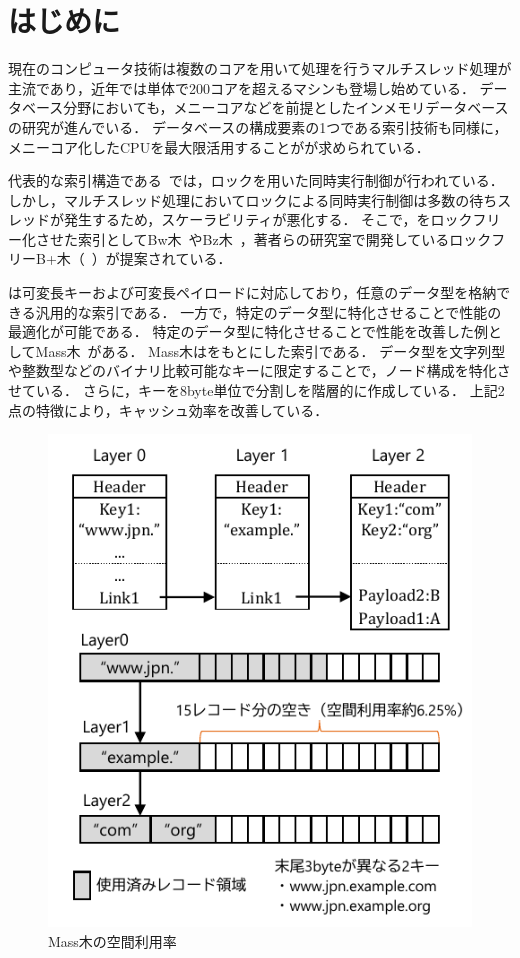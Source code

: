 
\section{はじめに}
現在のコンピュータ技術は複数のコアを用いて処理を行うマルチスレッド処理が主流であり，近年では単体で200コアを超えるマシンも登場し始めている．
データベース分野においても，メニーコアなどを前提としたインメモリデータベースの研究が進んでいる．
データベースの構成要素の1つである索引技術も同様に，メニーコア化したCPUを最大限活用することがが求められている．

代表的な索引構造である\Bptree{}~\cite{book:dbsystem}では，ロックを用いた同時実行制御が行われている．
しかし，マルチスレッド処理においてロックによる同時実行制御は多数の待ちスレッドが発生するため，スケーラビリティが悪化する．
そこで，\Bptree{}をロックフリー化させた索引としてBw木~\cite{book:Bwtree}やBz木~\cite{book:Bztree}，著者らの研究室で開発しているロックフリーB+木（\Bctree{}~\cite{deim:Hirano2024}）が提案されている．

\Bctree{}は可変長キーおよび可変長ペイロードに対応しており，任意のデータ型を格納できる汎用的な索引である．
一方で，特定のデータ型に特化させることで性能の最適化が可能である．
特定のデータ型に特化させることで性能を改善した例としてMass木~\cite{book:Masstree}がある．
Mass木は\Bptree{}をもとにした索引である．
データ型を文字列型や整数型などのバイナリ比較可能なキーに限定することで，ノード構成を特化させている．
さらに，キーを8byte単位で分割し\Bptree{}を階層的に作成している．
上記2点の特徴により，キャッシュ効率を改善している．

\begin{figure}[t]
    \centering
    \includegraphics{./figures/mass_memory.pdf}
    \caption{Mass木の空間利用率}
    \label{fig:memory}
\end{figure}

